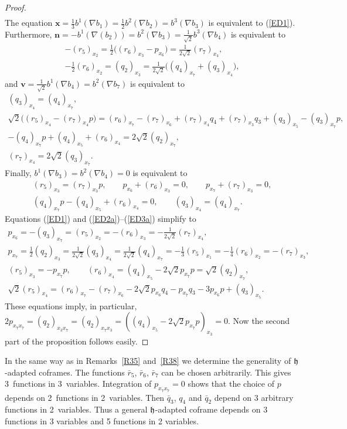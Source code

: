 \documentclass[pdftex]{sigma}
\numberwithin{equation}{section}
\newcommand\fh{{\frak h}}
\newcommand\bx{{\mathbf x}}
\newcommand\bn{{\mathbf n}}
\newcommand\bv{{\mathbf v}}
\begin{document}
\begin{proof}
\begin{gather*}
\end{gather*}
The equation $\bx=\frac13 b^1(\nabla b_1)=\frac12 b^2(\nabla b_2)=b^3(\nabla b_3)$ is equivalent to (\ref{ED1}). Furthermore,
$\bn=-b^1(\nabla(b_2))=b^2(\nabla b_3)=\frac1{\sqrt 2} b^3(\nabla b_4)$ is equivalent to
\begin{gather}
 -(r_5)_{x_2} =\tfrac12 \big((r_6)_{x_3}-p_{x_6}\big)=\tfrac1{2\sqrt 2} (r_7)_{x_4},\label{ED2a}\\
- \tfrac12 (r_6)_{x_2} =(q_2)_{x_3} =\tfrac1{2\sqrt 2}\big((q_4)_{x_7}+(q_3)_{x_4}\big),
\end{gather}
and $\bv=\frac1{\sqrt2} b^1(\nabla b_4)=b^2(\nabla b_7)$ is equivalent to
\begin{gather}
(q_3)_{x_4}=(q_4)_{x_7},\\
\sqrt2\big((r_5)_{x_4}-(r_7)_{x_4}p\big)=(r_6)_{x_7} -(r_7)_{x_6}+(r_7)_{x_4}q_4+(r_7)_{x_3}q_3+(q_3)_{x_5}-(q_3)_{x_7}p,\\
-(q_4)_{x_7}p+(q_4)_{x_5}+(r_6)_{x_4} = 2\sqrt2 (q_2)_{x_7}, \\
(r_7)_{x_4} = 2\sqrt2 (q_3)_{x_7}.
\end{gather}
Finally, $ b^1(\nabla b_3) =b^2(\nabla b_4 )=0$ is equivalent to
\begin{gather}
(r_5)_{x_3}=(r_7)_{x_3 }p,\qquad p_{x_6}+(r_6)_{x_3}=0,\qquad p_{x_7}+(r_7)_{x_3}=0, \\
(q_4)_{x_7}p-(q_4)_{x_5}+(r_6)_{x_4}=0, \qquad (q_3)_{x_4}=(q_4)_{x_7} . \label{ED3a}
 \end{gather}
Equations (\ref{ED1}) and (\ref{ED2a})--(\ref{ED3a}) simplify to
\begin{gather*}
p_{x_6}=-(q_3)_{x_7}=(r_5)_{x_2}=-(r_6)_{x_3}=- \tfrac1{2\sqrt2} (r_7)_{x_4},\\
p_{x_7}= \tfrac 12 (q_2)_{x_3}=\tfrac1{2\sqrt2}(q_3)_{x_4}=\tfrac1{2\sqrt2}(q_4)_{x_7}=-\tfrac13(r_5)_{x_1}=-\tfrac14(r_6)_{x_2}=-(r_7)_{x_3},\\
(r_5)_{x_3}=- p_{x_7}p,\qquad
(r_6)_{x_4}=(q_4)_{x_5}-2\sqrt2 p_{x_7}p=\sqrt2 (q_2)_{x_7},\\
\sqrt2 (r_5)_{x_4}=(r_6)_{x_7}-(r_7)_{x_6}-2\sqrt2 p_{x_6}q_4-p_{x_7}q_3-3p_{x_6}p+(q_3)_{x_5}.
\end{gather*}
These equations imply, in particular, $2p_{x_7 x_7}=(q_2)_{x_3 x_7}=(q_2)_{x_7 x_3}=((q_4)_{x_5}-2\sqrt2 p_{x_7}p)_{x_3}=0$. Now the second part of the proposition follows easily.
\end{proof}
\begin{Remark} In the same way as in Remarks~\ref{R35} and~\ref{R38} we determine the generality of $\fh$-adapted coframes. The functions $ \bar r_5$, $\bar r_6$, $\bar r_7$ can be chosen arbitrarily. This gives 3~functions in 3~variables. Integration of $p_{x_7 x_7}=0$ shows that the choice of $p$ depends on 2~functions in 2~variables. Then $\bar q_3$, $q_4$ and $\bar q_2$ depend on 3 arbitrary functions in 2~variables. Thus a general $\fh$-adapted coframe depends on 3 functions in 3 variables and 5 functions in 2 variables.
\end{Remark}
\end{document}
